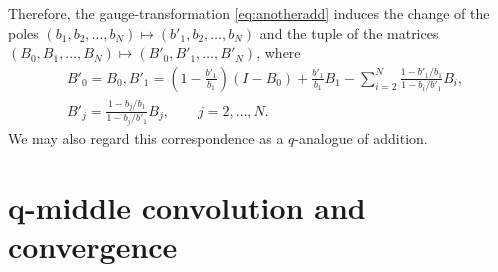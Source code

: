 \documentclass[pdftex]{sigma}
\numberwithin{equation}{section}
\theoremstyle{definition}
\begin{document}
Therefore, the gauge-transformation \eqref{eq:anotheradd} induces the change of the poles $(b_1, b_2, \dots ,b_N) \mapsto (b'_1, b_2, \dots ,b_N)$ and the tuple of the matrices $(B_0, B_1, \dots ,B_N) \mapsto (B'_0, B'_1, \dots ,B'_N)$, where
\begin{align*}
& B'_0=B_0, B'_1 = \left(1- \frac{b'_1 }{b_1} \right) ( I - B_{0} ) + \frac{b'_1}{b_1} B_{1} - \sum^{N}_{i = 2} \frac{1 - b'_1 / b_1 }{ 1 - b_i/ b'_1 } B_{i} , \\
& B'_j = \frac{1 - b_j /b_1}{1 - b_j /b'_1 } B_{j},\qquad j=2, \dots ,N.
\end{align*}
We may also regard this correspondence as a $q$-analogue of addition.

\section[q-middle convolution and convergence]{$\boldsymbol{q}$-middle convolution and convergence} \label{sec:qmc}
\end{document}
